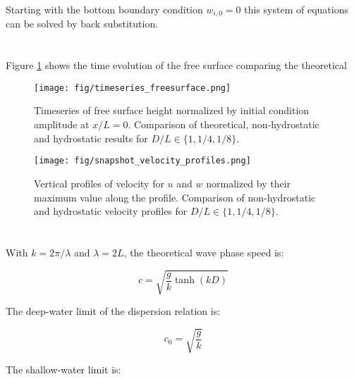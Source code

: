 \documentclass[12pt]{article}
\begin{document}
Starting with the bottom boundary condition $w_{i,0} = 0$ this system of equations can be solved by back substitution.

\section{}

Figure \ref{fig:timeseries_freesurface} shows the time evolution of the free surface comparing the theoretical 

	\begin{figure}[htb]
		\begin{center}
			\texttt{[image: fig/timeseries\_freesurface.png]}
			\caption{Timeseries of free surface height normalized by initial condition amplitude at $x/L=0$. Comparison of theoretical, non-hydrostatic and hydrostatic results for $D/L \in \{1, 1/4, 1/8\}$.}
			\label{fig:timeseries_freesurface}
		\end{center}
	\end{figure}

	\begin{figure}[htb]
		\begin{center}
			\texttt{[image: fig/snapshot\_velocity\_profiles.png]}
			\caption{Vertical profiles of velocity for $u$ and $w$ normalized by their maximum value along the profile. Comparison of non-hydrostatic and hydrostatic velocity profiles for $D/L \in \{1, 1/4, 1/8\}$.}
			\label{fig:snapshot_velocity_profiles}
		\end{center}
	\end{figure}

\section{}

With $k = 2\pi/\lambda$ and $\lambda = 2L$, the theoretical wave phase speed is:

\begin{equation} \label{eq:dispersion_relation}
c = \sqrt{\frac{g}{k} \tanh(kD)}
\end{equation}

The deep-water limit of the dispersion relation is:

\begin{equation} \label{eq:deep-water_limit}
c_0 = \sqrt{\frac{g}{k}}
\end{equation}

The shallow-water limit is:
\end{document}
